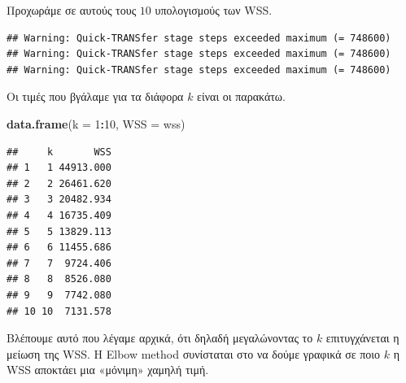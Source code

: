 \documentclass[
]{article}
\newenvironment{Shaded}{\begin{snugshade}}{\end{snugshade}}
\newcommand{\AttributeTok}[1]{\textcolor[rgb]{0.13,0.29,0.53}{#1}}
\newcommand{\CommentTok}[1]{\textcolor[rgb]{0.56,0.35,0.01}{\textit{#1}}}
\newcommand{\ControlFlowTok}[1]{\textcolor[rgb]{0.13,0.29,0.53}{\textbf{#1}}}
\newcommand{\DecValTok}[1]{\textcolor[rgb]{0.00,0.00,0.81}{#1}}
\newcommand{\FunctionTok}[1]{\textcolor[rgb]{0.13,0.29,0.53}{\textbf{#1}}}
\newcommand{\NormalTok}[1]{#1}
\newcommand{\OtherTok}[1]{\textcolor[rgb]{0.56,0.35,0.01}{#1}}
\newcommand{\SpecialCharTok}[1]{\textcolor[rgb]{0.81,0.36,0.00}{\textbf{#1}}}
\begin{document}
Προχωράμε σε αυτούς τους \(10\) υπολογισμούς των WSS.

\begin{Shaded}
\end{Shaded}

\begin{verbatim}
## Warning: Quick-TRANSfer stage steps exceeded maximum (= 748600)
## Warning: Quick-TRANSfer stage steps exceeded maximum (= 748600)
## Warning: Quick-TRANSfer stage steps exceeded maximum (= 748600)
\end{verbatim}

Οι τιμές που βγάλαμε για τα διάφορα \(k\) είναι οι παρακάτω.

\begin{Shaded}
\begin{Highlighting}[]
\FunctionTok{data.frame}\NormalTok{(}\AttributeTok{k =} \DecValTok{1}\SpecialCharTok{:}\DecValTok{10}\NormalTok{, }\AttributeTok{WSS =}\NormalTok{ wss)}
\end{Highlighting}
\end{Shaded}

\begin{verbatim}
##     k       WSS
## 1   1 44913.000
## 2   2 26461.620
## 3   3 20482.934
## 4   4 16735.409
## 5   5 13829.113
## 6   6 11455.686
## 7   7  9724.406
## 8   8  8526.080
## 9   9  7742.080
## 10 10  7131.578
\end{verbatim}

Βλέπουμε αυτό που λέγαμε αρχικά, ότι δηλαδή μεγαλώνοντας το \(k\)
επιτυγχάνεται η μείωση της WSS. Η Elbow method συνίσταται στο να δούμε
γραφικά σε ποιο \(k\) η WSS αποκτάει μια «μόνιμη» χαμηλή τιμή.
\end{document}
